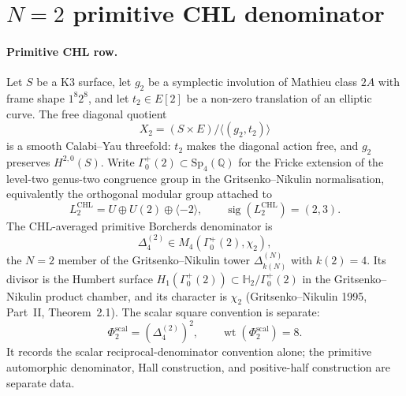 \providecommand{\kBKM}{\kappa_{\mathrm{BKM}}}
\providecommand{\kch}{\kappa_{\mathrm{ch}}}
\providecommand{\kcat}{\kappa_{\mathrm{cat}}}
\providecommand{\kfib}{\kappa_{\mathrm{fiber}}}
\providecommand{\Z}{\mathbb{Z}}
\providecommand{\cO}{\mathcal{O}}
\providecommand{\Hup}{\mathbb{H}_{2}}
\providecommand{\wt}{\operatorname{wt}}
\providecommand{\Ltwo}{L^{\mathrm{CHL}}_{2}}
\providecommand{\DeltaTwo}{\Delta_{4}^{(2)}}
\providecommand{\DeltaTwoGC}{\Delta_{2}^{\mathrm{GC}}}
\providecommand{\PhiTwoScal}{\Phi_{2}^{\mathrm{scal}}}
\providecommand{\PhiPrim}{\Phi^{\mathrm{prim}}}

\section*{$N=2$ primitive CHL denominator}
\label{sec:N2-CHL-automorphic-denominator}

\paragraph{Primitive CHL row.}
Let $S$ be a K3 surface, let $g_2$ be a symplectic involution of
Mathieu class $2A$ with frame shape $1^8 2^8$, and let
$t_2\in E[2]$ be a non-zero translation of an elliptic curve.  The
free diagonal quotient
\[
  X_2=(S\times E)/\langle(g_2,t_2)\rangle
\]
is a smooth Calabi--Yau threefold: $t_2$ makes the diagonal action free,
and $g_2$ preserves $H^{2,0}(S)$.  Write
$\Gamma_0^+(2)\subset\mathrm{Sp}_4(\mathbb Q)$ for the Fricke extension
of the level-two genus-two congruence group in the Gritsenko--Nikulin
normalisation, equivalently the orthogonal modular group attached to
\[
  \Ltwo = U\oplus U(2)\oplus\langle -2\rangle ,
  \qquad \operatorname{sig}(\Ltwo)=(2,3).
\]
The CHL-averaged primitive Borcherds denominator is
\[
  \DeltaTwo\in M_4(\Gamma_0^+(2),\chi_2),
\]
the $N=2$ member of the Gritsenko--Nikulin tower
$\Delta_{k(N)}^{(N)}$ with $k(2)=4$.  Its divisor is the Humbert surface
$H_1(\Gamma_0^+(2))\subset \Hup/\Gamma_0^+(2)$ in the Gritsenko--Nikulin
product chamber, and its character is $\chi_2$ (Gritsenko--Nikulin
1995, Part~II, Theorem~2.1).  The scalar square convention is separate:
\[
  \PhiTwoScal=(\DeltaTwo)^2,
  \qquad \wt(\PhiTwoScal)=8.
\]
It records the scalar reciprocal-denominator convention alone; the
primitive automorphic denominator, Hall construction, and positive-half
construction are separate data.

